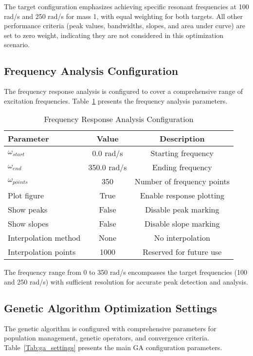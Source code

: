 \documentclass[12pt,a4paper]{article}
\begin{document}
The target configuration emphasizes achieving specific resonant frequencies at 100 rad/s and 250 rad/s for mass 1, with equal weighting for both targets. All other performance criteria (peak values, bandwidths, slopes, and area under curve) are set to zero weight, indicating they are not considered in this optimization scenario.

\subsection{Frequency Analysis Configuration}

The frequency response analysis is configured to cover a comprehensive range of excitation frequencies. Table~\ref{Tab:frequency_config} presents the frequency analysis parameters.

\begin{table}[h!]
\centering
\caption{Frequency Response Analysis Configuration}
\label{Tab:frequency_config}
\begin{tabular}{lcc}
\toprule
\textbf{Parameter} & \textbf{Value} & \textbf{Description} \\
\midrule
$\omega_{start}$ & 0.0 rad/s & Starting frequency \\
$\omega_{end}$ & 350.0 rad/s & Ending frequency \\
$\omega_{points}$ & 350 & Number of frequency points \\
Plot figure & True & Enable response plotting \\
Show peaks & False & Disable peak marking \\
Show slopes & False & Disable slope marking \\
Interpolation method & None & No interpolation \\
Interpolation points & 1000 & Reserved for future use \\
\bottomrule
\end{tabular}
\end{table}

The frequency range from 0 to 350 rad/s encompasses the target frequencies (100 and 250 rad/s) with sufficient resolution for accurate peak detection and analysis.

\subsection{Genetic Algorithm Optimization Settings}

The genetic algorithm is configured with comprehensive parameters for population management, genetic operators, and convergence criteria. Table~\ref{Tab:ga_settings} presents the main GA configuration parameters.
\end{document}
